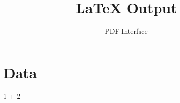\documentclass{article}[11pt]
\begin{document}
\title{LaTeX Output}
\author{PDF Interface}
\maketitle
\section{Data}
{1 + 2 }
\end{document}

